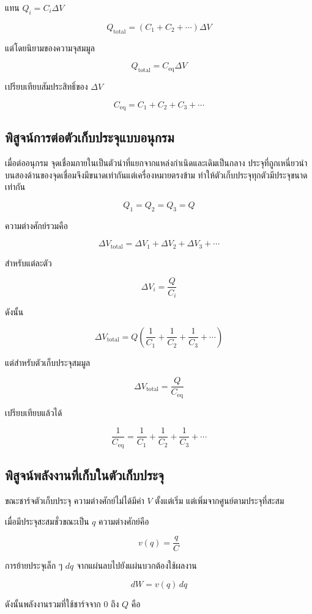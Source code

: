 แทน $Q_i=C_i\Delta V$

\[
Q_{\text{total}}
=(C_1+C_2+\cdots)\Delta V
\]

แต่โดยนิยามของความจุสมมูล

\[
Q_{\text{total}}=C_{\text{eq}}\Delta V
\]

เปรียบเทียบสัมประสิทธิ์ของ $\Delta V$

\[
\boxed{C_{\text{eq}}=C_1+C_2+C_3+\cdots}
\]

\subsection{พิสูจน์การต่อตัวเก็บประจุแบบอนุกรม}

เมื่อต่ออนุกรม จุดเชื่อมภายในเป็นตัวนำที่แยกจากแหล่งกำเนิดและเดิมเป็นกลาง ประจุที่ถูกเหนี่ยวนำบนสองด้านของจุดเชื่อมจึงมีขนาดเท่ากันแต่เครื่องหมายตรงข้าม ทำให้ตัวเก็บประจุทุกตัวมีประจุขนาดเท่ากัน

\[
Q_1=Q_2=Q_3=Q
\]

ความต่างศักย์รวมคือ

\[
\Delta V_{\text{total}}
=
\Delta V_1+\Delta V_2+\Delta V_3+\cdots
\]

สำหรับแต่ละตัว

\[
\Delta V_i=\frac{Q}{C_i}
\]

ดังนั้น

\[
\Delta V_{\text{total}}
=
Q\left(
\frac{1}{C_1}
+
\frac{1}{C_2}
+
\frac{1}{C_3}
+
\cdots
\right)
\]

แต่สำหรับตัวเก็บประจุสมมูล

\[
\Delta V_{\text{total}}=\frac{Q}{C_{\text{eq}}}
\]

เปรียบเทียบแล้วได้

\[
\boxed{
\frac{1}{C_{\text{eq}}}
=
\frac{1}{C_1}
+
\frac{1}{C_2}
+
\frac{1}{C_3}
+
\cdots}
\]

\subsection{พิสูจน์พลังงานที่เก็บในตัวเก็บประจุ}

ขณะชาร์จตัวเก็บประจุ ความต่างศักย์ไม่ได้มีค่า $V$ ตั้งแต่เริ่ม แต่เพิ่มจากศูนย์ตามประจุที่สะสม

เมื่อมีประจุสะสมชั่วขณะเป็น $q$ ความต่างศักย์คือ

\[
v(q)=\frac{q}{C}
\]

การย้ายประจุเล็ก ๆ $dq$ จากแผ่นลบไปยังแผ่นบวกต้องใช้ผลงาน

\[
dW=v(q)\,dq
\]

ดังนั้นพลังงานรวมที่ใช้ชาร์จจาก $0$ ถึง $Q$ คือ

